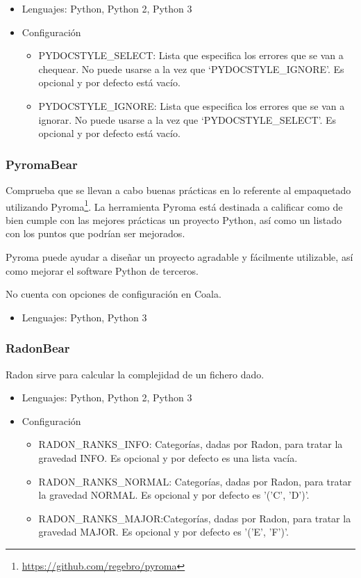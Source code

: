 \documentclass[a4paper, 12pt]{book}
\begin{document}
\begin{itemize}
  \item Lenguajes: Python, Python 2, Python 3
  \item Configuración
    \begin{itemize}
          \item PYDOCSTYLE\_SELECT: Lista que especifica los errores que se van a chequear. No puede usarse a la vez que `PYDOCSTYLE\_IGNORE'. Es opcional y por defecto está vacío.
          \item PYDOCSTYLE\_IGNORE: Lista que especifica los errores que se van a ignorar. No puede usarse a la vez que `PYDOCSTYLE\_SELECT'. Es opcional y por defecto está vacío.
    \end{itemize}
\end{itemize}

\subsubsection{PyromaBear}
\label{sec:seccion1.2.13}
Comprueba que se llevan a cabo buenas prácticas en lo referente al empaquetado utilizando Pyroma\footnote{\url{https://github.com/regebro/pyroma}}. La herramienta Pyroma está destinada a calificar como de bien cumple con las mejores prácticas un proyecto Python, así como un listado con los puntos que podrían ser mejorados.

Pyroma puede ayudar a diseñar un proyecto agradable y fácilmente utilizable, así como mejorar el software Python de terceros.

No cuenta con opciones de configuración en Coala.

\begin{itemize}
  \item Lenguajes: Python, Python 3
\end{itemize}

\subsubsection{RadonBear}
\label{sec:seccion1.2.14}
Radon sirve para calcular la complejidad de un fichero dado.

\begin{itemize}
  \item Lenguajes: Python, Python 2, Python 3
  \item Configuración
    \begin{itemize}
          \item RADON\_RANKS\_INFO: Categorías, dadas por Radon, para tratar la gravedad INFO. Es opcional y por defecto es una lista vacía.
          \item RADON\_RANKS\_NORMAL: Categorías, dadas por Radon, para tratar la gravedad NORMAL. Es opcional y por defecto es '('C', 'D')'.
          \item RADON\_RANKS\_MAJOR:Categorías, dadas por Radon, para tratar la gravedad MAJOR. Es opcional y por defecto es '('E', 'F')'.
    \end{itemize}
\end{itemize}
\end{document}

